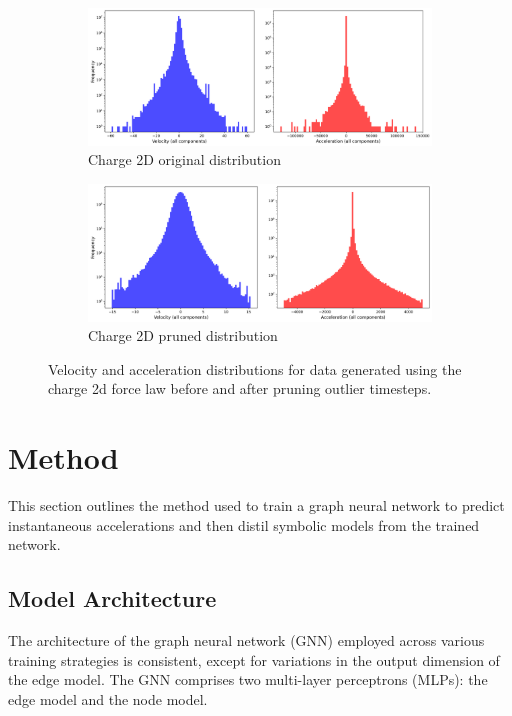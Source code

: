 \documentclass[11pt]{article}
\begin{document}
\begin{figure}[H]
    \centering
    \begin{subfigure}{0.9\textwidth}
        \includegraphics[width=\textwidth]{figs/charge_2_accel_vel_dist_unpruned.png}
        \caption{Charge 2D original distribution}
        \label{fig:charge_2_vel_dist_unpruned}
    \end{subfigure}
    \begin{subfigure}{0.9\textwidth}
        \includegraphics[width=\textwidth]{figs/charge_2_accel_vel_dist_pruned.png}
        \caption{Charge 2D pruned distribution}
        \label{fig:charge_2_vel_dist_pruned}
    \end{subfigure}
    \caption{Velocity and acceleration distributions for data generated using the charge 2d force law before and after pruning outlier timesteps.}
    \label{fig:distributions}
\end{figure}


\section{Method}
This section outlines the method used to train a graph neural network to predict instantaneous accelerations and then distil symbolic models from the trained network.

\subsection{Model Architecture}
The architecture of the graph neural network (GNN) employed across various training strategies is consistent, except for variations in the output dimension of the edge model. The GNN comprises two multi-layer perceptrons (MLPs): the edge model and the node model.
\end{document}
